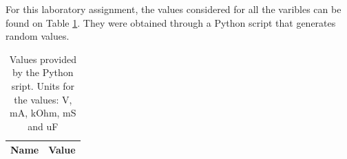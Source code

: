 
\vspace{1cm}

For this laboratory assignment, the values considered for all the varibles can be
found on Table \ref{tab:given_vls}. They were obtained through a Python script that
generates random values. 

\begin{table}[ht]
	\centering
	\begin{tabular}{|l|r|}
		\hline    
		{\bf Name} & {\bf Value} \\ \hline
    		
	\end{tabular}
	
	\caption{Values provided by the Python sript. Units for the values: V, mA, kOhm, mS and uF}
    
\label{tab:given_vls}
\end{table}

